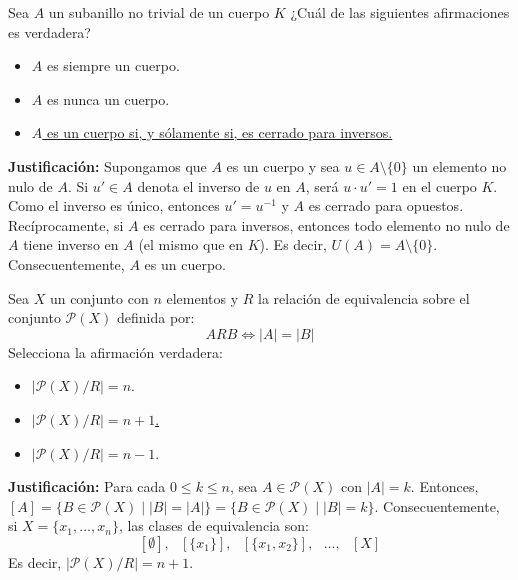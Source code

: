 \documentclass[12pt]{article}
\begin{document}
    \begin{ejercicio}
       Sea $A$ un subanillo no trivial de un cuerpo $K$ ¿Cuál de las siguientes afirmaciones es verdadera? 
        \begin{itemize}
            \item $A$ es siempre un cuerpo.
            \item $A$ es nunca un cuerpo.
            \item \underline{$A$ es un cuerpo si, y sólamente si, es cerrado para inversos.}
        \end{itemize}
        \textbf{Justificación:}\newline
        Supongamos que $A$ es un cuerpo y sea $u \in A\setminus \{0\}$ un elemento no nulo de $A$.\newline
        Si $u' \in A$ denota el inverso de $u$ en $A$, será $u\cdot u'=1$ en el cuerpo $K$.\newline
        Como el inverso es único, entonces $u'=u^{-1}$ y $A$ es cerrado para opuestos.\\

        \noindent
        Recíprocamente, si $A$ es cerrado para inversos, entonces todo elemento no nulo de $A$ tiene inverso en $A$ (el mismo que en $K$).\newline
        Es decir, $U(A) = A\setminus \{0\}$. Consecuentemente, $A$ es un cuerpo.
    \end{ejercicio}

    \begin{ejercicio}
        Sea $X$ un conjunto con $n$ elementos y $R$ la relación de equivalencia sobre el conjunto $\mathcal{P}(X)$ definida por:
        $$A R B \Leftrightarrow |A| = |B|$$
        Selecciona la afirmación verdadera:
        \begin{itemize}
            \item $|\mathcal{P}(X)/R| = n$.
            \item \underline{$|\mathcal{P}(X)/R| = n+1$.}
            \item $|\mathcal{P}(X)/R| = n-1$.
        \end{itemize}
        \textbf{Justificación:}\newline
        Para cada $0\leq k\leq n$, sea $A\in \mathcal{P}(X)$ con $|A|=k$.\newline
        Entonces, $[A] = \{B \in \mathcal{P}(X) \mid |B| = |A|\} = \{B \in \mathcal{P}(X) \mid |B| = k\}$.\newline
        Consecuentemente, si $X = \{x_1, \ldots, x_n\}$, las clases de equivalencia son:
        $$[\emptyset],~~~[\{x_1\}],~~~[\{x_1,x_2\}],~~~\ldots,~~~[X]$$
        Es decir, $|\mathcal{P}(X)/R| = n+1$.
    \end{ejercicio}
\end{document}
